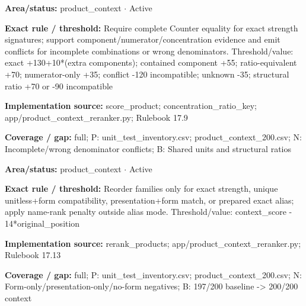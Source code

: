 \begin{tcolorbox}[enhanced,breakable,colback=white,colframe=Muted!45,boxrule=0.45pt,arc=1.5pt,left=6pt,right=6pt,top=5pt,bottom=5pt,title={\texttt{PC-STRENGTH-SCORE-11}},title after break={\texttt{PC-STRENGTH-SCORE-11}\ (continued)},fonttitle=\headingfont\bfseries\color{Navy},coltitle=Navy]
\textbf{Area/status:} product\_\allowbreak{}context $\boldsymbol{\cdot}$ Active\par
\smallskip
\textbf{Exact rule / threshold:} Require complete Counter equality for exact strength signatures; support component/\allowbreak{}numerator/\allowbreak{}concentration evidence and emit conflicts for incomplete combinations or wrong denominators. Threshold/\allowbreak{}value: exact +130+10*(extra components); contained component +55; ratio-equivalent +70; numerator-only +35; conflict -120 incompatible; unknown -35; structural ratio +70 or -90 incompatible\par
\smallskip
\textbf{Implementation source:} score\_\allowbreak{}product; concentration\_\allowbreak{}ratio\_\allowbreak{}key; app/\allowbreak{}product\_\allowbreak{}context\_\allowbreak{}reranker.py; Rulebook 17.9\par
\smallskip
\textbf{Coverage / gap:} full; P: unit\_\allowbreak{}test\_\allowbreak{}inventory.csv; product\_\allowbreak{}context\_\allowbreak{}200.csv; N: Incomplete/\allowbreak{}wrong denominator conflicts; B: Shared units and structural ratios
\end{tcolorbox}
\begin{tcolorbox}[enhanced,breakable,colback=white,colframe=Muted!45,boxrule=0.45pt,arc=1.5pt,left=6pt,right=6pt,top=5pt,bottom=5pt,title={\texttt{PC-STRONG-REORDER-18}},title after break={\texttt{PC-STRONG-REORDER-18}\ (continued)},fonttitle=\headingfont\bfseries\color{Navy},coltitle=Navy]
\textbf{Area/status:} product\_\allowbreak{}context $\boldsymbol{\cdot}$ Active\par
\smallskip
\textbf{Exact rule / threshold:} Reorder families only for exact strength, unique unitless+form compatibility, presentation+form match, or prepared exact alias; apply name-rank penalty outside alias mode. Threshold/\allowbreak{}value: context\_\allowbreak{}score - 14*original\_\allowbreak{}position\par
\smallskip
\textbf{Implementation source:} rerank\_\allowbreak{}products; app/\allowbreak{}product\_\allowbreak{}context\_\allowbreak{}reranker.py; Rulebook 17.13\par
\smallskip
\textbf{Coverage / gap:} full; P: unit\_\allowbreak{}test\_\allowbreak{}inventory.csv; product\_\allowbreak{}context\_\allowbreak{}200.csv; N: Form-only/\allowbreak{}presentation-only/\allowbreak{}no-form negatives; B: 197/\allowbreak{}200 baseline -> 200/\allowbreak{}200 context
\end{tcolorbox}
